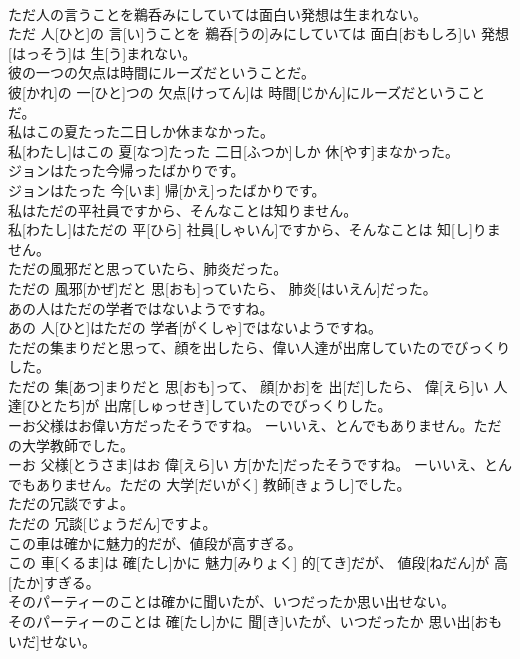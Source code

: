 \documentclass[8pt]{extreport}
\begin{document}
\begin{CJK}{UTF8}{min}
\\	ただ人の言うことを鵜呑みにしていては面白い発想は生まれない。	
\\	ただ 人[ひと]の 言[い]うことを 鵜呑[うの]みにしていては 面白[おもしろ]い 発想[はっそう]は 生[う]まれない。
\\	彼の一つの欠点は時間にルーズだということだ。	
\\	彼[かれ]の 一[ひと]つの 欠点[けってん]は 時間[じかん]にルーズだということだ。
\\	私はこの夏たった二日しか休まなかった。	
\\	私[わたし]はこの 夏[なつ]たった 二日[ふつか]しか 休[やす]まなかった。
\\	ジョンはたった今帰ったばかりです。	
\\	ジョンはたった 今[いま] 帰[かえ]ったばかりです。
\\	私はただの平社員ですから、そんなことは知りません。	
\\	私[わたし]はただの 平[ひら] 社員[しゃいん]ですから、そんなことは 知[し]りません。
\\	ただの風邪だと思っていたら、肺炎だった。	
\\	ただの 風邪[かぜ]だと 思[おも]っていたら、 肺炎[はいえん]だった。
\\	あの人はただの学者ではないようですね。	
\\	あの 人[ひと]はただの 学者[がくしゃ]ではないようですね。
\\	ただの集まりだと思って、顔を出したら、偉い人達が出席していたのでびっくりした。	
\\	ただの 集[あつ]まりだと 思[おも]って、 顔[かお]を 出[だ]したら、 偉[えら]い 人達[ひとたち]が 出席[しゅっせき]していたのでびっくりした。
\\	ーお父様はお偉い方だったそうですね。 ーいいえ、とんでもありません。ただの大学教師でした。	
\\	ーお 父様[とうさま]はお 偉[えら]い 方[かた]だったそうですね。 ーいいえ、とんでもありません。ただの 大学[だいがく] 教師[きょうし]でした。
\\	ただの冗談ですよ。	
\\	ただの 冗談[じょうだん]ですよ。
\\	この車は確かに魅力的だが、値段が高すぎる。	
\\	この 車[くるま]は 確[たし]かに 魅力[みりょく] 的[てき]だが、 値段[ねだん]が 高[たか]すぎる。
\\	そのパーティーのことは確かに聞いたが、いつだったか思い出せない。	
\\	そのパーティーのことは 確[たし]かに 聞[き]いたが、いつだったか 思い出[おもいだ]せない。

\end{CJK}
\end{document}
